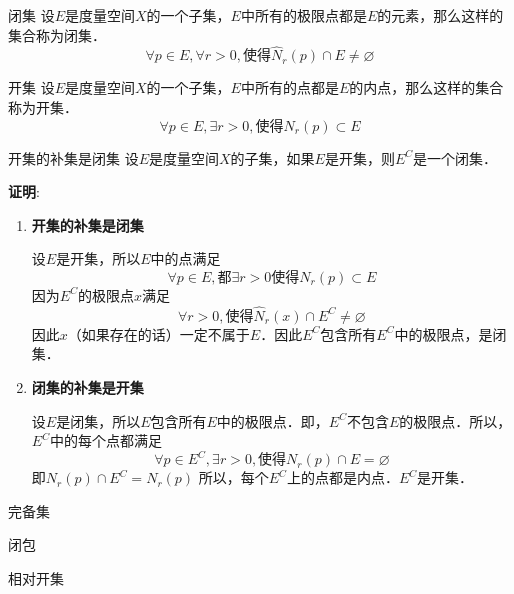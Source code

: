 \begin{definition}{闭集}
设$E$是度量空间$X$的一个子集，$E$中所有的极限点都是$E$的元素，那么这样的集合称为闭集．
\begin{equation}
\forall{p\in{E}},\forall{r>0},\text{使得}\hat{N}_r(p)\cap{E}\not=\varnothing
\end{equation}
\end{definition}

\begin{definition}{开集}
设$E$是度量空间$X$的一个子集，$E$中所有的点都是$E$的内点，那么这样的集合称为开集．
\begin{equation}
\forall{p\in{E}},\exists{r>0},\text{使得}N_r(p)\subset{E}
\end{equation}
\end{definition}

\begin{theorem}{开集的补集是闭集}
设$E$是度量空间$X$的子集，如果$E$是开集，则$E^C$是一个闭集．
\end{theorem}
\textbf{证明}:
\begin{enumerate}
\item \textbf{开集的补集是闭集}

设$E$是开集，所以$E$中的点满足
\begin{equation}
\forall{p\in{E}},\text{都}\exists{r}>0\text{使得}N_r(p)\subset{E}
\end{equation}
因为$E^C$的极限点$x$满足
\begin{equation}
\forall{r}>0,\text{使得}\hat{N}_r(x)\cap{E^C}\not=\varnothing
\end{equation}
因此$x$（如果存在的话）一定不属于$E$．因此$E^C$包含所有$E^C$中的极限点，是闭集．

\item \textbf{闭集的补集是开集}

设$E$是闭集，所以$E$包含所有$E$中的极限点．即，$E^C$不包含$E$的极限点．所以，$E^C$中的每个点都满足
\begin{equation}
\forall{p}\in{E^C},\exists{r>0},\text{使得}N_r(p)\cap{E}=\varnothing
\end{equation}
即$N_r(p)\cap{E^C}=N_r(p)$
所以，每个$E^C$上的点都是内点．$E^C$是开集．
\end{enumerate}


\begin{definition}{完备集}

\end{definition}

\begin{definition}{闭包}
\end{definition}

\begin{definition}{相对开集}

\end{definition}